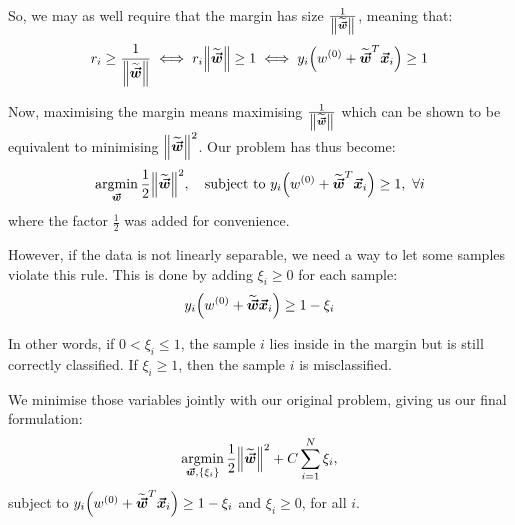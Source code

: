 \documentclass[a4paper]{article}
\begin{document}
{    So, we may as well require that the margin has size $\frac{1}{\left\|\widetilde{\bvec{w}}\right\|}$, meaning that: 
    \[r_i \geq \frac{1}{\left\|\widetilde{\bvec{w}}\right\|} \iff r_i \left\|\widetilde{\bvec{w}}\right\| \geq 1 \iff y_i \left(w^{\left(0\right)} + \widetilde{\bvec{w}}^T \bvec{x}_i\right) \geq 1\]

    Now, maximising the margin means maximising $\frac{1}{\left\|\widetilde{\bvec{w}}\right\|}$ which can be shown to be equivalent to minimising $\left\|\widetilde{\bvec{w}}\right\|^2$. Our problem has thus become: 
    \[\argmin_{\bvec{w}} \frac{1}{2} \left\|\widetilde{\bvec{w}}\right\|^2, \mathspace \text{subject to } y_i \left(w^{\left(0\right)} + \widetilde{\bvec{w}}^T \bvec{x}_i\right) \geq 1, \ \forall i\]
    where the factor $\frac{1}{2}$ was added for convenience.

    However, if the data is not linearly separable, we need a way to let some samples violate this rule. This is done by adding  $\xi_i \geq 0$ for each sample: 
    \[y_i \left(w^{\left(0\right)} + \widetilde{\bvec{w}} \bvec{x}_i\right) \geq 1 - \xi_i\]

    In other words, if $0 < \xi_i \leq 1$, the sample $i$ lies inside in the margin but is still correctly classified. If $\xi_i \geq 1$, then the sample $i$ is misclassified. 

    We minimise those variables jointly with our original problem, giving us our final formulation:
    \[\argmin_{\bvec{w}, \left\{\xi_i\right\}} \frac{1}{2} \left\|\widetilde{\bvec{w}}\right\|^2 + C \sum_{i=1}^{N} \xi_i, \]
    subject to $y_i \left(w^{\left(0\right)} + \widetilde{\bvec{w}}^T \bvec{x}_i\right) \geq 1 - \xi_i$ and $\xi_i \geq 0$, for all $i$.
}
\end{document}
